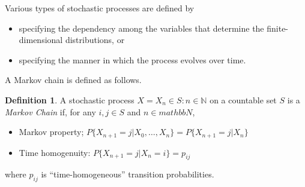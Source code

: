 \documentclass[twoside]{article}
\theoremstyle{definition}
\newtheorem{definition}{Definition}[section]
\theoremstyle{remark}
\theoremstyle{remark}
\begin{document}
Various types of stochastic processes are defined by
\begin{itemize}
  \item specifying the dependency among the variables that determine
  the finite-dimensional distributions, or
  \item specifying the manner in which the process evolves over time.
\end{itemize}
A Markov chain is defined as follows.

\begin{definition}
  A stochastic process $X = {X_n \in S : n \in \mathbb{N}}$ on a countable set
  $S$ is a \textit{Markov Chain} if, for any $i,j \in S$ and $n \in mathbb{N}$,
  \begin{itemize}
    \item Markov property; $P{\{X_{n+1} = j | X_0, \ldots, X_n\}} = P{\{X_{n+1} = j | X_n\}}$
    \item Time homogenuity: $P{\{X_{n+1} = j | X_n = i\}} = p_{ij}$
  \end{itemize}
  where $p_{ij}$ is ``time-homogeneous'' transition probabilities.
\end{definition}
\end{document}
